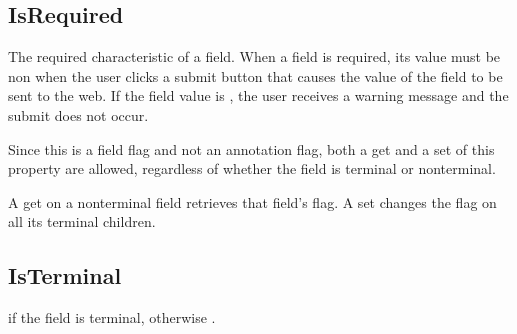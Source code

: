 \documentclass[letterpaper,12pt,english,openany,oneside]{sphinxmanual}
\begin{document}
\subsection{IsRequired}
\label{\detokenize{IAC_API_FormsIntro:isrequired}}
The required characteristic of a field. When a field is required, its value must be non\sphinxhyphen{} when the user clicks a submit button that causes the value of the field to be sent to the web. If the field value is , the user receives a warning message and the submit does not occur.

Since this is a field flag and not an annotation flag, both a get and a set of this property are allowed, regardless of whether the field is terminal or non\sphinxhyphen{}terminal.

A get on a non\sphinxhyphen{}terminal field retrieves that field’s flag. A set changes the flag on all its terminal children.

\label{\detokenize{IAC_API_FormsIntro:syntax-23}}

\begin{sphinxVerbatim}[commandchars=\\\{\}]
\PYG{p}{[}\PYG{p}{]} 
\end{sphinxVerbatim}




\subsection{IsTerminal}
\label{\detokenize{IAC_API_FormsIntro:isterminal}}
 if the field is terminal, otherwise .

\label{\detokenize{IAC_API_FormsIntro:syntax-24}}

\begin{sphinxVerbatim}[commandchars=\\\{\}]
\PYG{p}{[}\PYG{p}{]} 
\end{sphinxVerbatim}
\label{\detokenize{IAC_API_FormsIntro:example-16}}

\begin{sphinxVerbatim}[commandchars=\\\{\}]
   
   

  
\end{sphinxVerbatim}
\end{document}
